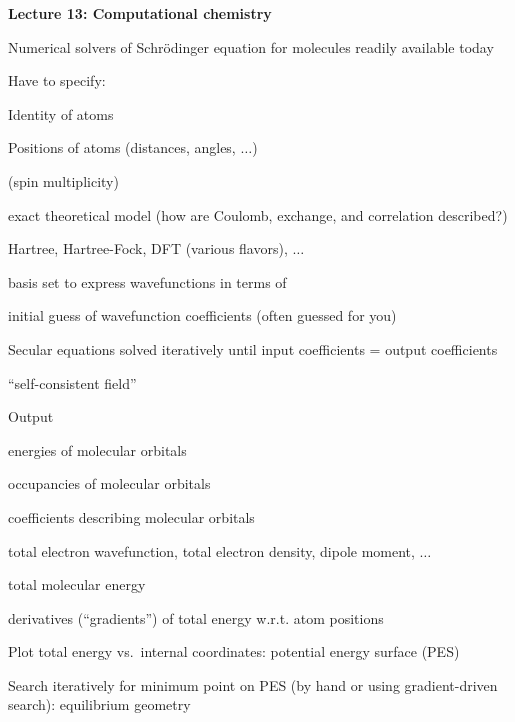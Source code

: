 \message{ !name(Outline.tex)}\documentclass[11pt]{article}
\begin{document}
\begin{outline}
\item {\bf Lecture 13: Computational chemistry}
  \begin{outline}
  \item Numerical solvers of Schr\"odinger equation for molecules readily
    available today
  \item Have to specify:
    \begin{outline}
    \item Identity of atoms
    \item Positions of atoms (distances, angles, $\ldots$)
    \item (spin multiplicity)
    \item exact theoretical model (how are Coulomb, exchange, and correlation described?)
      \begin{outline}
      \item Hartree, Hartree-Fock, DFT (various flavors), $\ldots$
      \end{outline}
    \item basis set to express wavefunctions in terms of
    \item initial guess of wavefunction coefficients (often guessed for you)
    \end{outline}
  \item Secular equations solved iteratively until input coefficients = output coefficients
    \begin{outline}
      \item ``self-consistent field''
    \end{outline}
  \item Output
    \begin{outline}
      \item energies of molecular orbitals
      \item occupancies of molecular orbitals
      \item coefficients describing molecular orbitals
      \item total electron wavefunction, total electron density, dipole moment, $\ldots$
      \item total molecular energy
      \item derivatives (``gradients'') of total energy w.r.t. atom positions
    \end{outline}
  \item Plot total energy vs.\ internal coordinates: potential energy surface (PES)
  \item Search iteratively for minimum point on PES (by hand or using
    gradient-driven search): equilibrium geometry

\end{outline}
\end{outline}
\end{document}
